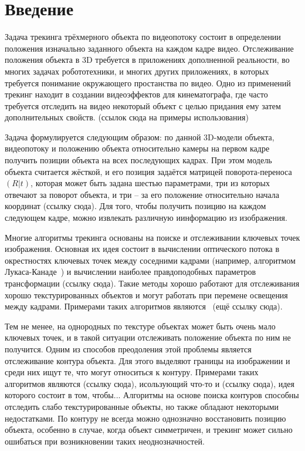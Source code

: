 \section{Введение}

Задача трекинга трёхмерного объекта по видеопотоку состоит в определении положения изначально заданного объекта на каждом кадре видео. Отслеживание положения объекта в 3D требуется в приложениях дополненной реальности, во многих задачах робототехники, и многих других приложениях, в которых требуется понимание окружающего простанства по видео. Одно из применений трекинг находит в создании видеоэффектов для кинематографа, где часто требуется отследить на видео некоторый объект с целью придания ему затем дополнительных свойств. (ссылок сюда на примеры использования)

Задача формулируется следующим образом: по данной 3D-модели объекта, видеопотоку и положению объекта относительно камеры на первом кадре получить позиции объекта на всех последующих кадрах. При этом модель объекта считается жёсткой, и его позиция задаётся матрицей поворота-переноса $(R | t)$, которая может быть задана шестью параметрами, три из которых отвечают за поворот объекта, и три -- за его положение относительно начала координат (ссылку сюда). Для того, чтобы получить позицию на каждом следующем кадре, можно извлекать различную иинформацию из изображения. 

Многие алгоритмы трекинга основаны на поиске и отслеживании ключевых точек изображения. Основная их идея состоит в вычислении оптического потока в окрестностях ключевых точек между соседними кадрами (например, алгоритмом Лукаса-Канаде~\cite{LukasKanade}) и вычислении наиболее правдоподобных параметров трансформации (ссылку сюда). Такие методы хорошо работают для отслеживания хорошо текстурированных объектов и могут работать при перемене освещения между кадрами. Примерами таких алгоритмов являются~\cite{LourakisFeatures} (ещё ссылку сюда). 

Тем не менее, на однородных по текстуре объектах может быть очень мало ключевых точек, и в такой ситуации отслеживать положение объекта по ним не получится. Одним из способов преодоления этой проблемы является отслеживание контура объекта. Для этого выделяют границы на изображении и среди них ищут те, что могут относиться к контуру. Примерами таких алгоритмов являются (ссылку сюда), исользующий что-то и (ссылку сюда), идея которого состоит в том, чтобы... Алгоритмы на основе поиска контуров способны отследить слабо текстурированные объекты, но также обладают некоторыми недостатками. По контуру не всегда можно однозначно восстановить позицию объекта, особенно в случае, когда объект симметричен, и трекинг может сильно ошибаться при возникновении таких неоднозначностей.


